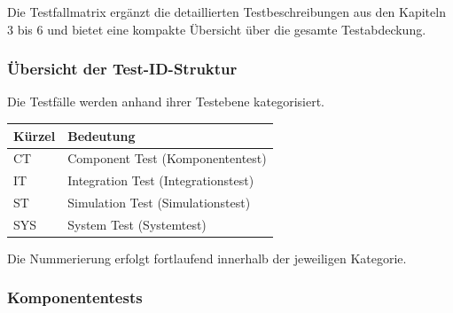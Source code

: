 Die Testfallmatrix ergänzt die detaillierten Testbeschreibungen aus den
Kapiteln 3 bis 6 und bietet eine kompakte Übersicht über die gesamte
Testabdeckung.

\subsubsection{Übersicht der
Test-ID-Struktur}\label{uxfcbersicht-der-test-id-struktur}

Die Testfälle werden anhand ihrer Testebene kategorisiert.

\begin{longtable}[]{@{}ll@{}}
\toprule\noalign{}
Kürzel & Bedeutung \\
\midrule\noalign{}
\endhead
\bottomrule\noalign{}
\endlastfoot
CT & Component Test (Komponententest) \\
IT & Integration Test (Integrationstest) \\
ST & Simulation Test (Simulationstest) \\
SYS & System Test (Systemtest) \\
\end{longtable}

Die Nummerierung erfolgt fortlaufend innerhalb der jeweiligen Kategorie.

\subsubsection{Komponententests}\label{komponententests-2}

